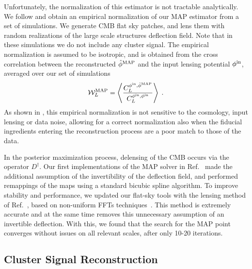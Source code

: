 \documentclass[prd, superscriptaddress, tightenlines, longbibliography, nofootinbib, eqsecnum, amsfonts, amsmath, floatfix, twocolumn, notitlepage]{revtex4-2}
\newcommand{\JC}[1]{\color{purple}{{JC:#1}}\color{black}\xspace}
\newcommand{\LL}[1]{{\color{orange}{LL: #1}}}
\begin{document}
Unfortunately, the normalization of this estimator is not tractable analytically. We follow \cite{Legrand:2021qdu,Legrand:2023jne} and obtain an empirical normalization of our MAP estimator from a set of simulations.
We generate \LL{1000?} CMB flat sky patches, and lens them with random realizations of the large scale structures deflection field. Note that in these simulations we do not include any cluster signal. The empirical normalization is assumed to be isotropic, and is obtained from the cross correlation between the reconstructed $\hat \phi^{\rm MAP}$ and the input lensing potential $\phi^{\rm in}$, averaged over our set of simulations
\begin{equation}
    \mathcal{W}^{\rm MAP}_L = \left< \frac{C_L^{\phi^{\rm in}, \hat \phi^{\rm MAP}}}{C_L^{\phi^{\rm in}, \phi^{\rm in}}} \right> \; .
\end{equation}
As shown in \cite{Legrand:2021qdu,Legrand:2023jne}, this empirical normalization is not sensitive to the cosmology, input lensing or data noise, allowing for a correct normalization also when the fiducial ingredients entering the reconstruction process are a poor match to those of the data.


In the posterior maximization process, delensing of the CMB occurs via the operator $D^\dagger$. Our first implementations of the MAP solver in Ref.~\cite{Carron:2017mqf} made the additional assumption of the invertibility of the deflection field, and performed remappings of the maps using a standard bicubic spline algorithm. To improve stability and performance, we updated our flat-sky tools with the lensing method of Ref.~\cite{Reinecke:2023gtp}, based on non-uniform FFTs techniques~\cite{Barnett2019, Barnett2020}. This method is extremely accurate and at the same time removes this unnecessary assumption of an invertible deflection. With this, we found that the search for the MAP point converges without issues on all relevant scales, after only 10-20 iterations\JC{is that right ?}.


\subsection{Cluster Signal Reconstruction}
\label{sec:cluster_mass}
\LL{Should add a comment that to have the template kt we first need an estimate of the angular size of the cluster $\theta_s$ (which can be obtained from SZ effect like in Zubeldia paper, or else)}
\end{document}
